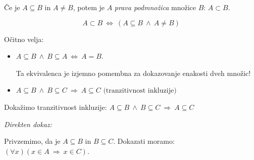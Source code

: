 \documentclass[11pt,paper=b5,DIV=13,headinclude,footinclude]{scrbook}
\def\ali {{~\vee~}}
\def\inn {{~\wedge~}}
\def\sledi {{~\Rightarrow~}}
\def\cee {{~\Leftrightarrow~}}
\begin{document}
 Če je $A\subseteq B$ in $A\neq B$, potem je $A$ {\em prava podmnožica} množice $B$: $A\subset B$.

$$A\subset B\cee (A\subseteq B \inn A\neq B)$$

Očitno velja:
\begin{itemize}
  \item $A\subseteq B \inn B\subseteq A \cee A = B$.

  Ta ekvivalenca je izjemno pomembna za dokazovanje enakosti dveh množic!
  \item $A\subseteq B \inn B\subseteq C \sledi A \subseteq C \textrm{~(tranzitivnost inkluzije)}$
\end{itemize}


%
%
%
%
%
%
%
%
%
%
%
%
%
%

%
%

Dokažimo tranzitivnost inkluzije: $A\subseteq B \inn B\subseteq C \sledi A \subseteq C$

{\em Direkten dokaz:}

Privzemimo, da je $A\subseteq B$ in $B\subseteq C$.
Dokazati moramo: $(\forall x)(x\in A\sledi x\in C)$.
\end{document}
